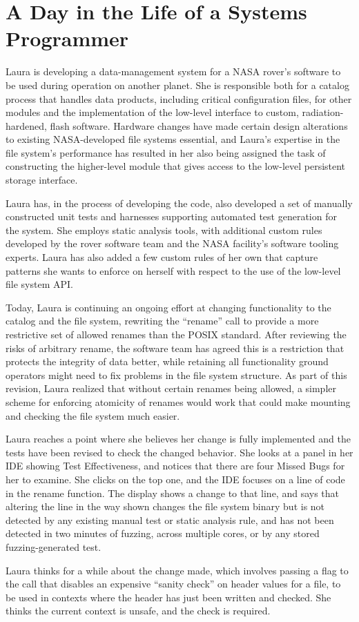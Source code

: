 \section{A Day in the Life of a Systems Programmer}

Laura is developing a data-management system for a NASA rover's software to be used during operation on another planet.  She is responsible both for a catalog process that handles data products, including critical configuration files, for other modules and the implementation of the low-level interface to custom, radiation-hardened, flash software.  Hardware changes have made certain design alterations to existing NASA-developed file systems essential, and Laura's expertise in the file system's performance has resulted in her also being assigned the task of constructing the higher-level module that gives access to the low-level persistent storage interface.

Laura has, in the process of developing the code, also developed a set of manually constructed unit tests and harnesses supporting automated test generation for the system.  She employs static analysis tools, with additional custom rules developed by the rover software team and the NASA facility's software tooling experts.  Laura has also added a few custom rules of her own that capture patterns she wants to enforce on herself with respect to the use of the low-level file system API.

Today, Laura is continuing an ongoing effort at changing functionality to the catalog and the file system, rewriting the ``rename'' call to provide a more restrictive set of allowed renames than the POSIX standard.  After reviewing the risks of arbitrary rename, the software team has agreed this is a restriction that protects the integrity of data better, while retaining all functionality ground operators might need to fix problems in the file system structure.  As part of this revision, Laura realized that without certain renames being allowed, a simpler scheme for enforcing atomicity of renames would work that could make mounting and checking the file system much easier.

Laura reaches a point where she believes her change is fully implemented and the tests have been revised to check the changed behavior.  She looks at a panel in her IDE showing Test Effectiveness, and notices that there are four Missed Bugs for her to examine.  She clicks on the top one, and the IDE focuses on a line of code in the rename function.  The display shows a change to that line, and says that altering the line in the way shown changes the file system binary but is not detected by any existing manual test or static analysis rule, and has not been detected in two minutes of fuzzing, across multiple cores, or by any stored fuzzing-generated test.

Laura thinks for a while about the change made, which involves passing a flag to the call that disables an expensive ``sanity check'' on header values for a file, to be used in contexts where the header has just been written and checked.  She thinks the current context is unsafe, and the check is required.